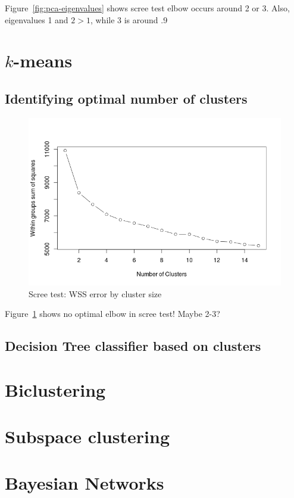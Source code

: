\documentclass[letter,12pt]{article}
\begin{document}
Figure~\ref{fig:pca-eigenvalues} shows scree test elbow occurs around 2 or 3. Also, eigenvalues 1 and $2 > 1$, while 3
is around .9

\section{$k$-means}
\subsection{Identifying optimal number of clusters}

\begin{figure}[h]
  \centering
  \includegraphics[width=0.8\linewidth]{kmeans-wss-error.png}
  \caption{Scree test: WSS error by cluster size}
  \label{fig:kmeans-wss-error}
\end{figure}

Figure~\ref{fig:kmeans-wss-error} shows no optimal elbow in scree test! Maybe 2-3?


\subsection{Decision Tree classifier based on clusters}


\section{Biclustering}

\section{Subspace clustering}


\section{Bayesian Networks}
\end{document}

